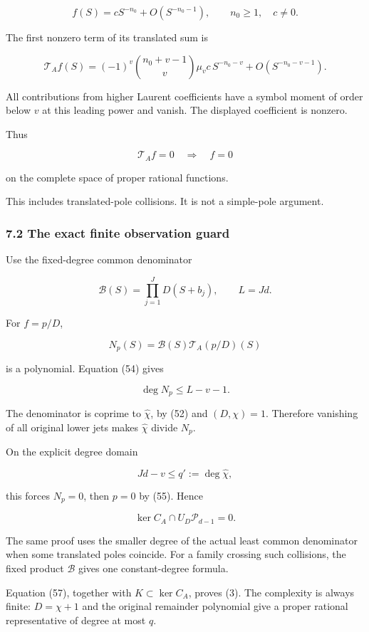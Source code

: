 \documentclass[11pt]{article}
\begin{document}
\[
f(S)=cS^{-n_0}+O(S^{-n_0-1}),
\qquad n_0\ge1,\quad c\ne0.
\]

The first nonzero term of its translated sum is

\[
\boxed{
\mathcal T_Af(S)
=
(-1)^v
\binom{n_0+v-1}{v}\mu_vc\,
S^{-n_0-v}
+O(S^{-n_0-v-1}).
}
\tag{54}
\]

All contributions from higher Laurent coefficients have a symbol moment of order below \(v\) at this leading power and vanish. The displayed coefficient is nonzero.

Thus

\[
\boxed{\mathcal T_Af=0\quad\Longrightarrow\quad f=0}
\tag{55}
\]

on the complete space of proper rational functions.

This includes translated-pole collisions. It is not a simple-pole argument.

\subsubsection{7.2 The exact finite observation guard}\label{the-exact-finite-observation-guard}

Use the fixed-degree common denominator

\[
\mathcal B(S)=\prod_{j=1}^{J}D(S+b_j),
\qquad L=Jd.
\]

For \(f=p/D\),

\[
N_p(S)=\mathcal B(S)\mathcal T_A(p/D)(S)
\]

is a polynomial. Equation (54) gives

\[
\deg N_p\le L-v-1.
\]

The denominator is coprime to \(\widehat\chi\), by (52) and \((D,\chi)=1\). Therefore vanishing of all original lower jets makes \(\widehat\chi\) divide \(N_p\).

On the explicit degree domain

\[
\boxed{Jd-v\le q':=\deg\widehat\chi,}
\tag{56}
\]

this forces \(N_p=0\), then \(p=0\) by (55). Hence

\[
\boxed{\ker C_A\cap U_D\mathcal P_{d-1}=0.}
\tag{57}
\]

The same proof uses the smaller degree of the actual least common denominator when some translated poles coincide. For a family crossing such collisions, the fixed product \(\mathcal B\) gives one constant-degree formula.

Equation (57), together with \(K\subset\ker C_A\), proves (3). The complexity is always finite: \(D=\chi+1\) and the original remainder polynomial give a proper rational representative of degree at most \(q\).
\end{document}
